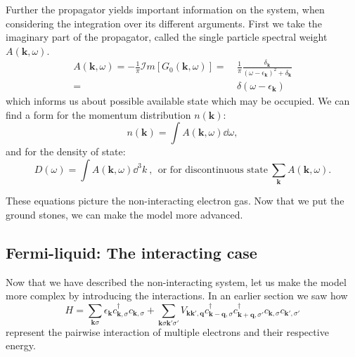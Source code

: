 \documentclass[../main.tex]{subfile}
\begin{document}
Further the propagator yields important information on the system, when considering the integration over its different arguments. First we take the imaginary 
part of the propagator, called the single particle spectral weight $A(\bm{k}, \omega)$.
\begin{equation}
    \begin{aligned}\label{eq:SingleParticleSpectralWeight}
        A(\bm{k}, \omega) = -\frac{1}{\pi} \mathcal{I}m \left[G_0(\bm{k}, \omega)\right] =~& \frac{1}{\pi} \frac{\delta_{\bm{k}}}{(\omega- \epsilon_{\bm{k}})^2 + \delta_{\bm{k}}}\\
        =~&\delta(\omega- \epsilon_{\bm{k}})
    \end{aligned}
\end{equation}
which informs us about possible available state which may be occupied. We can find a form for the momentum distribution $n(\bm{k})$:
\begin{equation}
    n(\bm{k}) = \int A(\bm{k},\omega) \dd \omega,\label{eq:MomentumDistribution}
\end{equation}
and for the density of state:
\begin{equation}\label{eq:DensityOfState}
    D(\omega) = \int A(\bm{k},\omega) \dd ^3 k~,~~ \text{or for discontinuous state}~ \sum_{\bm{k}} A(\bm{k}, \omega).
\end{equation}

These equations picture the non-interacting electron gas. Now that we put the ground stones, we can make the model more advanced.

\subsection{Fermi-liquid: The interacting case}
Now that we have described the non-interacting system, let us make the model more complex by introducing the interactions.
In an earlier section we saw how
\begin{equation} \label{eq:FermiLiquid_Hamiltonian}
    H = \sum_{\bm{k}\sigma} \epsilon_{\bm{k}} c_{\bm{k},\sigma}^{\dagger}c_{\bm{k},\sigma} + \sum_{\bm{k}\sigma\bm{k}'\sigma'}
        V_{\bm{k}\bm{k}', \bm{q}} c_{\bm{k}-\bm{q},\sigma}^{\dagger}c_{\bm{k}+\bm{q},\sigma'}^{\dagger}c_{\bm{k},\sigma}c_{\bm{k}',\sigma'}
\end{equation}
represent the pairwise interaction of multiple electrons and their respective energy.\\
\end{document}
